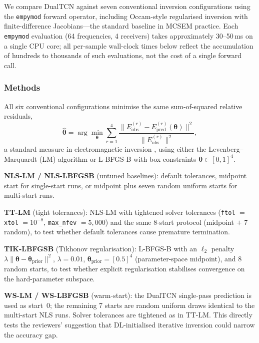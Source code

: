 \documentclass[journal]{IEEEtran}
\begin{document}
We compare DualTCN against seven conventional inversion
configurations using the \texttt{empymod} forward operator,
including Occam-style regularised inversion
\citep{constable1987occam} with finite-difference Jacobians---the
standard baseline in MCSEM practice.  Each \texttt{empymod}
evaluation (64 frequencies, 4 receivers) takes approximately
30--50\,ms on a single CPU core; all per-sample wall-clock times
below reflect the accumulation of hundreds to thousands of such
evaluations, not the cost of a single forward call.

\subsubsection{Methods}

All six conventional configurations minimise the same sum-of-squared
relative residuals,
\begin{equation}
  \hat{\boldsymbol{\theta}} = \arg\min_{\boldsymbol{\theta}}
    \sum_{r=1}^{4}
    \frac{\|E_\mathrm{obs}^{(r)}
          - E_\mathrm{pred}^{(r)}(\boldsymbol{\theta})\|^2}
         {\|E_\mathrm{obs}^{(r)}\|^2},
  \label{eq:misfit}
\end{equation}
a standard measure in electromagnetic inversion
\citep{constable1987occam}, using either the Levenberg--Marquardt
(LM) algorithm \citep{more1978levenberg} or L-BFGS-B
\citep{byrd1995limited, zhu1997algorithm} with box constraints
$\boldsymbol{\theta} \in [0,1]^4$.

\textbf{NLS-LM / NLS-LBFGSB} (untuned baselines): default
tolerances, midpoint start for single-start runs, or midpoint plus
seven random uniform starts for multi-start runs.

\textbf{TT-LM} (tight tolerances): NLS-LM with tightened solver
tolerances (\texttt{ftol} $=$ \texttt{xtol} $= 10^{-8}$,
\texttt{max\_nfev} $= 5{,}000$) and the same 8-start protocol
(midpoint $+$ 7 random), to test whether default tolerances cause
premature termination.

\textbf{TIK-LBFGSB} (Tikhonov regularisation): L-BFGS-B with an
$\ell_2$ penalty
$\lambda \|\boldsymbol{\theta} - \boldsymbol{\theta}_\mathrm{prior}\|^2$,
$\lambda = 0.01$, $\boldsymbol{\theta}_\mathrm{prior} = [0.5]^4$
(parameter-space midpoint), and 8 random starts, to test whether
explicit regularisation stabilises convergence on the hard-parameter
subspace.

\textbf{WS-LM / WS-LBFGSB} (warm-start): the DualTCN single-pass
prediction is used as start~0; the remaining 7 starts are random
uniform draws identical to the multi-start NLS runs. Solver
tolerances are tightened as in TT-LM. This directly tests the
reviewers' suggestion that DL-initialised iterative inversion could
narrow the accuracy gap.
\end{document}
